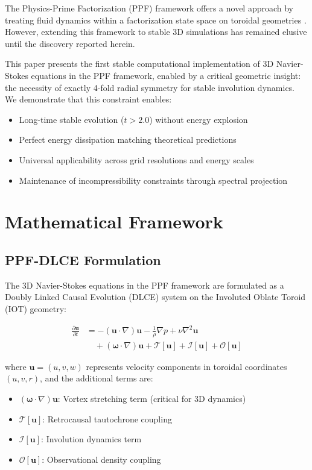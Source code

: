 \documentclass[conference]{IEEEtran}
\begin{document}
The Physics-Prime Factorization (PPF) framework offers a novel approach by treating fluid dynamics within a factorization state space on toroidal geometries \cite{PPF_Theory}. However, extending this framework to stable 3D simulations has remained elusive until the discovery reported herein.

This paper presents the first stable computational implementation of 3D Navier-Stokes equations in the PPF framework, enabled by a critical geometric insight: the necessity of exactly 4-fold radial symmetry for stable involution dynamics. We demonstrate that this constraint enables:

\begin{itemize}
\item Long-time stable evolution ($t > 2.0$) without energy explosion
\item Perfect energy dissipation matching theoretical predictions
\item Universal applicability across grid resolutions and energy scales
\item Maintenance of incompressibility constraints through spectral projection
\end{itemize}

\section{Mathematical Framework}

\subsection{PPF-DLCE Formulation}

The 3D Navier-Stokes equations in the PPF framework are formulated as a Doubly Linked Causal Evolution (DLCE) system on the Involuted Oblate Toroid (IOT) geometry:

\begin{align}
\frac{\partial \mathbf{u}}{\partial t} &= -(\mathbf{u} \cdot \nabla)\mathbf{u} - \frac{1}{\rho}\nabla p + \nu \nabla^2 \mathbf{u} \nonumber \\
&\quad + (\boldsymbol{\omega} \cdot \nabla)\mathbf{u} + \mathcal{T}[\mathbf{u}] + \mathcal{I}[\mathbf{u}] + \mathcal{O}[\mathbf{u}]
\end{align}

where $\mathbf{u} = (u, v, w)$ represents velocity components in toroidal coordinates $(u, v, r)$, and the additional terms are:

\begin{itemize}
\item $(\boldsymbol{\omega} \cdot \nabla)\mathbf{u}$: Vortex stretching term (critical for 3D dynamics)
\item $\mathcal{T}[\mathbf{u}]$: Retrocausal tautochrone coupling
\item $\mathcal{I}[\mathbf{u}]$: Involution dynamics term
\item $\mathcal{O}[\mathbf{u}]$: Observational density coupling
\end{itemize}
\end{document}
